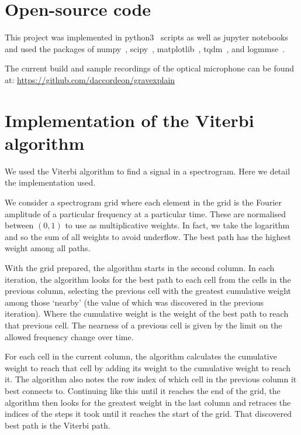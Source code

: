\documentclass[paper-main.tex]{subfiles}
\begin{document}
\section{Open-source code}
\label{app:code}
This project was implemented in python3~\cite{python} scripts as well as jupyter notebooks~\cite{jupyter}~\cite{ipython} and used the packages of numpy~\cite{numpy}, scipy~\cite{scipy}, matplotlib~\cite{matplotlib}, tqdm~\cite{tqdm}, and logmmse~\cite{logmmse}.

The current build and sample recordings of the optical microphone can be found at:
\url{https://github.com/daccordeon/gravexplain}

\section{Implementation of the Viterbi algorithm}
\label{app:viterbi}

We used the Viterbi algorithm to find a signal in a spectrogram. Here we detail the implementation used.

We consider a spectrogram grid where each element in the grid is the Fourier amplitude of a particular frequency at a particular time. These are normalised between $(0, 1)$ to use as multiplicative weights. In fact, we take the logarithm and so the sum of all weights to avoid underflow. The best path has the highest weight among all paths.

With the grid prepared, the algorithm starts in the second column. In each iteration, the algorithm looks for the best path to each cell from the cells in the previous column, selecting the previous cell with the greatest cumulative weight among those ‘nearby’ (the value of which was discovered in the previous iteration). Where the cumulative weight is the weight of the best path to reach that previous cell. The nearness of a previous cell is given by the limit on the allowed frequency change over time.

For each cell in the current column, the algorithm calculates the cumulative weight to reach that cell by adding its weight to the cumulative weight to reach it. The algorithm also notes the row index of which cell in the previous column it best connects to.
Continuing like this until it reaches the end of the grid, the algorithm then looks for the greatest weight in the last column and retraces the indices of the steps it took until it reaches the start of the grid. That discovered best path is the Viterbi path.
\end{document}

